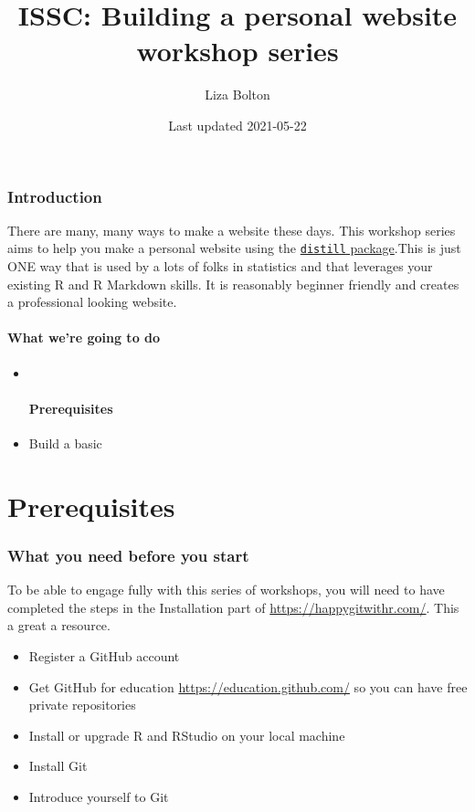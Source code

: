 \documentclass[
]{article}
\title{ISSC: Building a personal website workshop series}
\author{Liza Bolton}
\date{Last updated 2021-05-22}
\providecommand{\tightlist}{%
  \setlength{\itemsep}{0pt}\setlength{\parskip}{0pt}}
\begin{document}
\maketitle

{
\setcounter{tocdepth}{2}
\tableofcontents
}
\hypertarget{introduction}{%
\section{Introduction}\label{introduction}}

There are many, many ways to make a website these days. This workshop series aims to help you make a personal website using the \href{https://rstudio.github.io/distill/}{\texttt{distill} package}.This is just ONE way that is used by a lots of folks in statistics and that leverages your existing R and R Markdown skills. It is reasonably beginner friendly and creates a professional looking website.

\hypertarget{what-were-going-to-do}{%
\subsection{What we're going to do}\label{what-were-going-to-do}}

\begin{itemize}
\item ~
  \hypertarget{prerequisites}{%
  \subsection{Prerequisites}\label{prerequisites}}
\item
  Build a basic
\end{itemize}

\hypertarget{part-prerequisites}{%
\part{Prerequisites}\label{part-prerequisites}}

\hypertarget{prereqs}{%
\section{What you need before you start}\label{prereqs}}

To be able to engage fully with this series of workshops, you will need to have completed the steps in the Installation part of
\url{https://happygitwithr.com/}. This a great a resource.

\begin{itemize}
\tightlist
\item
  Register a GitHub account
\item
  Get GitHub for education
  \url{https://education.github.com/} so you can have free private
  repositories
\item
  Install or upgrade R and
  RStudio on your local machine
\item
  Install Git
\item
  Introduce yourself to Git
\end{itemize}
\end{document}
